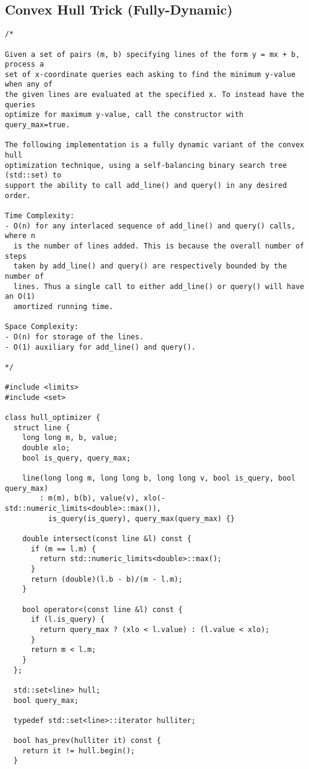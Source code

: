\subsection{Convex Hull Trick (Fully-Dynamic)}
\begin{lstlisting}
/*

Given a set of pairs (m, b) specifying lines of the form y = mx + b, process a
set of x-coordinate queries each asking to find the minimum y-value when any of
the given lines are evaluated at the specified x. To instead have the queries
optimize for maximum y-value, call the constructor with query_max=true.

The following implementation is a fully dynamic variant of the convex hull
optimization technique, using a self-balancing binary search tree (std::set) to
support the ability to call add_line() and query() in any desired order.

Time Complexity:
- O(n) for any interlaced sequence of add_line() and query() calls, where n
  is the number of lines added. This is because the overall number of steps
  taken by add_line() and query() are respectively bounded by the number of
  lines. Thus a single call to either add_line() or query() will have an O(1)
  amortized running time.

Space Complexity:
- O(n) for storage of the lines.
- O(1) auxiliary for add_line() and query().

*/

#include <limits>
#include <set>

class hull_optimizer {
  struct line {
    long long m, b, value;
    double xlo;
    bool is_query, query_max;

    line(long long m, long long b, long long v, bool is_query, bool query_max)
        : m(m), b(b), value(v), xlo(-std::numeric_limits<double>::max()),
          is_query(is_query), query_max(query_max) {}

    double intersect(const line &l) const {
      if (m == l.m) {
        return std::numeric_limits<double>::max();
      }
      return (double)(l.b - b)/(m - l.m);
    }

    bool operator<(const line &l) const {
      if (l.is_query) {
        return query_max ? (xlo < l.value) : (l.value < xlo);
      }
      return m < l.m;
    }
  };

  std::set<line> hull;
  bool query_max;

  typedef std::set<line>::iterator hulliter;

  bool has_prev(hulliter it) const {
    return it != hull.begin();
  }


\end{lstlisting}
